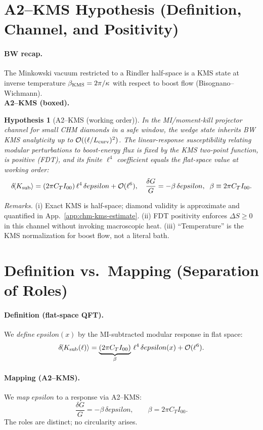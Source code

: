 \documentclass[aps,prd,onecolumn,superscriptaddress,nofootinbib]{revtex4-2}
\def\eps{epsilon}%
\providecommand{\eps}{\varepsilon}
\newtheorem{hypothesis}{Hypothesis}
\begin{document}
\section{A2--KMS Hypothesis (Definition, Channel, and Positivity)}
\label{sec:A2KMS}
\paragraph{BW recap.} The Minkowski vacuum restricted to a Rindler half-space is a KMS state at inverse temperature \(\beta_{\rm KMS}=2\pi/\kappa\) with respect to boost flow (Bisognano--Wichmann).\\[3pt]
\noindent\textbf{A2--KMS (boxed).}
\begin{hypothesis}[A2--KMS (working order)]
\label{hyp:A2KMS}
In the MI/moment-kill projector channel for small CHM diamonds in a safe window, the wedge state inherits BW KMS analyticity up to \(\mathcal O((\ell/L_{\rm curv})^2)\). The linear-response susceptibility relating modular perturbations to boost-energy flux is fixed by the KMS two-point function, is positive (FDT), and its finite \(\ell^4\) coefficient equals the flat-space value at working order:
\[
\delta\!\langle K_{\rm sub}\rangle=(2\pi C_T I_{00})\,\ell^4\,\delta\eps+\mathcal O(\ell^6),\quad
\frac{\delta G}{G}=-\beta\,\delta\eps,\;\;\beta\equiv 2\pi C_T I_{00}.
\]
\end{hypothesis}
\noindent\emph{Remarks.} (i) Exact KMS is half-space; diamond validity is approximate and quantified in App.~\ref{app:chm-kms-estimate}. (ii) FDT positivity enforces \(\Delta S\ge 0\) in this channel without invoking macroscopic heat. (iii) ``Temperature'' is the KMS normalization for boost flow, not a literal bath.

\section{Definition vs.\ Mapping (Separation of Roles)}
\label{sec:def-vs-map}
\paragraph{Definition (flat-space QFT).} We \emph{define} \(\eps(x)\) by the MI-subtracted modular response in flat space:
\begin{equation}
\label{eq:eps-def}
\delta\!\langle K_{\rm sub}(\ell)\rangle = \underbrace{(2\pi C_T I_{00})}_{\beta}\,\ell^4\,\delta\eps(x) + \mathcal O(\ell^6).
\end{equation}
\paragraph{Mapping (A2--KMS).} We \emph{map} \(\eps\) to a response via A2--KMS:
\begin{equation}
\label{eq:mapping}
\frac{\delta G}{G}=-\beta\,\delta\eps,\qquad \beta=2\pi C_T I_{00}.
\end{equation}
The roles are distinct; no circularity arises.
\end{document}
